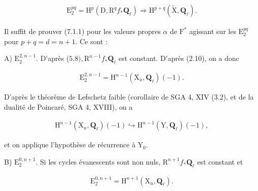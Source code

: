 \documentclass[10pt,leqno]{article}
\begin{document}
\begin{equation*}\begin{gathered}\mathrm{E}_{2}^{pq}=\mathrm{H}^{p}(\mathrm{D},\mathrm{R}^{q} f_{*}\mathbf{Q}_{\ell }) \Rightarrow  \mathrm{H}^{p+q}(\widetilde{\mathrm{X}},\mathbf{Q}_{\ell }).\end{gathered}\end{equation*}

\noindent Il suffit de prouver (7.1.1) pour les valeurs propres \(\alpha \) de \(\mathrm{F}^{*}\) agissant sur les \(\mathrm{E}_{2}^{pq}\) pour \(p+q=d=n+1\). Ce sont :\par

\noindent A) \(\mathrm{E}_{2}^{2,n- 1}\). D’après (\(5.8), \mathrm{R}^{n- 1}f_{*}\mathbf{Q}_{\ell }\) est constant. D’après (2.10), on a donc\par

\begin{equation*}\begin{gathered}\mathrm{E}_{2}^{2,n- 1}=\mathrm{H}^{n- 1}(\mathrm{X}_{u},\mathbf{Q}_{\ell })(- 1).\end{gathered}\end{equation*}

\noindent D’après le théorème de Lefschetz faible (corollaire de SGA 4, XIV (3.2), et de la dualité de Poincaré, SGA 4, XVIII), on a\par

\begin{equation*}\begin{gathered}\mathrm{H}^{n- 1}(\mathrm{X}_{u},\mathbf{Q}_{\ell })(- 1) \hookrightarrow  \mathrm{H}^{n- 1}(\mathrm{Y},\mathbf{Q}_{\ell })(- 1),\end{gathered}\end{equation*}

\noindent et on applique l’hypothèse de récurrence à \(\mathrm{Y}_{0}\).\par

\noindent B) \(\mathrm{E}_{2}^{0,n+1}\). Si les cycles évanescents sont non nuls, \(\mathrm{R}^{n+1}f_{*}\mathbf{Q}_{\ell }\) est constant et\par

\begin{equation*}\begin{gathered}\mathrm{E}_{2}^{0,n+1}=\mathrm{H}^{n+1}(\mathrm{X}_{u},\mathbf{Q}_{\ell }).\end{gathered}\end{equation*}

\clearpage
\end{document}
